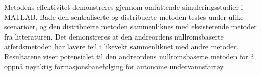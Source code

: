 Metodens effektivitet demonstreres gjennom omfattende simuleringsstudier i MATLAB. Både den sentraliserte og distribuerte metoden testes under ulike scenarioer, og den distribuerte metoden sammenliknes med eksisterende metoder fra litteraturen. Det demonstreres at den andreordens nullromsbaserte atferdsmetoden har lavere feil i likevekt sammenliknet med andre metoder. Resultatene viser potensialet til den andreordens nullromsbaserte metoden for å oppnå nøyaktig formasjonsbanefølging for autonome undervannsfartøy.
%
\clearpage
